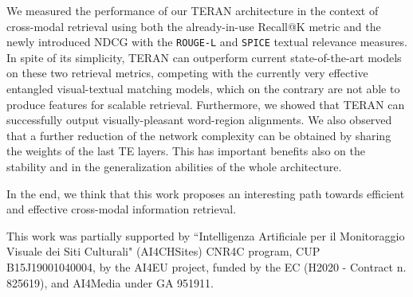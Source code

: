 \documentclass[acmsmall]{acmart}
\newcommand{\majorrevised}[1]{#1}
\begin{document}
We measured the performance of our TERAN architecture in the context of cross-modal retrieval using both the already-in-use Recall@K metric and the newly introduced NDCG with the \texttt{ROUGE-L} and \texttt{SPICE} textual relevance measures.
\majorrevised{In spite of its simplicity, TERAN can outperform current state-of-the-art models on these two retrieval metrics, competing with the currently very effective entangled visual-textual matching models, which on the contrary are not able to produce features for scalable retrieval. Furthermore, we showed that TERAN can successfully output visually-pleasant word-region alignments.}
We also observed that a further reduction of the network complexity can be obtained by sharing the weights of the last TE layers. This has important benefits also on the stability and in the generalization abilities of the whole architecture.

In the end, we think that this work proposes an interesting path towards efficient and effective cross-modal information retrieval.



\begin{acks}
This work was partially supported by “Intelligenza Artificiale per il Monitoraggio Visuale dei Siti Culturali" (AI4CHSites) CNR4C program,
CUP B15J19001040004, by the AI4EU project,
funded by the EC (H2020 - Contract n. 825619), and AI4Media under GA 951911.
\end{acks}



\end{document}
